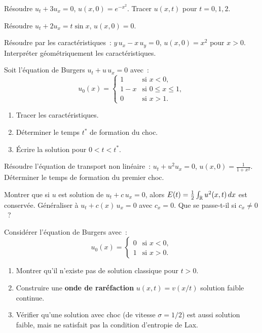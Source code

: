 \begin{exercice}
R\'esoudre $u_t + 3u_x = 0$, $u(x,0) = e^{-x^2}$. Tracer $u(x,t)$
pour $t = 0, 1, 2$.
\end{exercice}

\begin{exercice}
R\'esoudre $u_t + 2u_x = t\sin x$, $u(x,0) = 0$.
\end{exercice}

\begin{exercice}
R\'esoudre par les caract\'eristiques~:
$y\, u_x - x\, u_y = 0$, $u(x,0) = x^2$ pour $x > 0$.
Interpr\'eter g\'eom\'etriquement les caract\'eristiques.
\end{exercice}

\begin{exercice}
Soit l'\'equation de Burgers $u_t + u\, u_x = 0$ avec~:
\[
    u_0(x) = \begin{cases}
        1 & \text{si } x < 0,\\
        1 - x & \text{si } 0 \leq x \leq 1,\\
        0 & \text{si } x > 1.
    \end{cases}
\]
\begin{enumerate}
    \item Tracer les caract\'eristiques.
    \item D\'eterminer le temps $t^*$ de formation du choc.
    \item \'Ecrire la solution pour $0 < t < t^*$.
\end{enumerate}
\end{exercice}

\begin{exercice}
R\'esoudre l'\'equation de transport non lin\'eaire~:
$u_t + u^2 u_x = 0$, $u(x,0) = \frac{1}{1+x^2}$.
D\'eterminer le temps de formation du premier choc.
\end{exercice}

\begin{exercice}
Montrer que si $u$ est solution de $u_t + c\, u_x = 0$, alors
$E(t) = \frac{1}{2}\int_{\mathbb{R}} u^2(x,t)\, dx$ est conserv\'ee.
G\'en\'eraliser \`a $u_t + c(x)\, u_x = 0$ avec $c_x = 0$.
Que se passe-t-il si $c_x \neq 0$~?
\end{exercice}

\begin{exercice}
Consid\'erer l'\'equation de Burgers avec~:
\[
    u_0(x) = \begin{cases}
        0 & \text{si } x < 0,\\
        1 & \text{si } x > 0.
    \end{cases}
\]
\begin{enumerate}
    \item Montrer qu'il n'existe pas de solution classique pour $t > 0$.
    \item Construire une \textbf{onde de rar\'efaction} $u(x,t) = v(x/t)$
          solution faible continue.
    \item V\'erifier qu'une solution avec choc (de vitesse $\sigma = 1/2$)
          est aussi solution faible, mais ne satisfait pas la condition
          d'entropie de Lax.
\end{enumerate}
\end{exercice}
